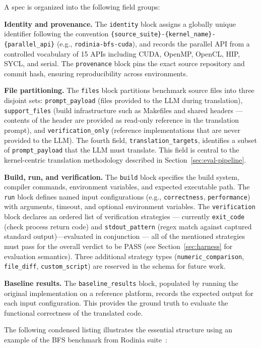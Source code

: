 \documentclass[conference]{IEEEtran}
\begin{document}
A spec is organized into the following field groups:

\textbf{Identity and provenance.} The \texttt{identity} block assigns a globally unique identifier following the convention \texttt{\{source\_suite\}-\{kernel\_name\}-\{parallel\_api\}} (e.g., \texttt{rodinia-bfs-cuda}), and records the parallel API from a controlled vocabulary of 15 APIs including CUDA, OpenMP, OpenCL, HIP, SYCL, and serial. The \texttt{provenance} block pins the exact source repository and commit hash, ensuring reproducibility across environments.

\textbf{File partitioning.} The \texttt{files} block partitions benchmark source files into three disjoint sets: \texttt{prompt\_payload} (files provided to the LLM during translation), \texttt{support\_files} (build infrastructure such as Makefiles and shared headers --- contents of the header are provided as read-only reference in the translation prompt), and \texttt{verification\_only} (reference implementations that are never provided to the LLM). The fourth field, \texttt{translation\_targets}, identifies a subset of \texttt{prompt\_payload} that the LLM must translate. This field is central to the kernel-centric translation methodology described in Section~\ref{sec:eval-pipeline}.

\textbf{Build, run, and verification.} The \texttt{build} block specifies the build system, compiler commands, environment variables, and expected executable path. The \texttt{run} block defines named input configurations (e.g., \texttt{correctness}, \texttt{performance}) with arguments, timeout, and optional environment variables. The \texttt{verification} block declares an ordered list of verification strategies --- currently \texttt{exit\_code} (check process return code) and \texttt{stdout\_pattern} (regex match against captured standard output)---evaluated in conjunction --- all of the mentioned strategies must pass for the overall verdict to be PASS (see Section~\ref{sec:harness} for evaluation semantics). Three additional strategy types (\texttt{numeric\_comparison}, \texttt{file\_diff}, \texttt{custom\_script}) are reserved in the schema for future work. 

\textbf{Baseline results.} The \texttt{baseline\_results} block, populated by running the original implementation on a reference platform, records the expected output for each input configuration. This provides the ground truth to evaluate the functional correctness of the translated code.

The following condensed listing illustrates the essential structure using an example of the BFS benchmark from Rodinia suite~\cite{Rodinia2009}:
\end{document}
